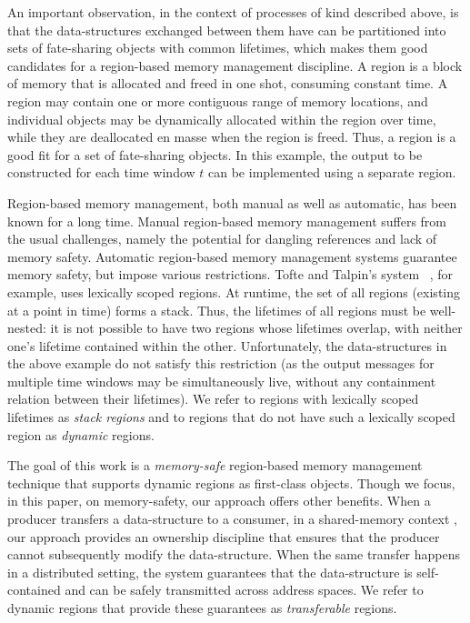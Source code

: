 
An important observation, in the context of processes of kind
described above, is that the data-structures exchanged between them
have can be partitioned into sets of fate-sharing objects with common
lifetimes, which makes them good candidates for a region-based memory
management discipline. A region is a block of memory that is allocated
and freed in one shot, consuming constant time. A region may contain
one or more contiguous range of memory locations, and individual
objects may be dynamically allocated within the region over time,
while they are deallocated en masse when the region is freed.  Thus, a
region is a good fit for a set of fate-sharing objects.
In this example, the output to be constructed for each time window $t$
can be implemented using a separate region.

Region-based memory management, both manual as well as automatic, has
been known for a long time. Manual region-based memory management
suffers from the usual challenges, namely the potential for dangling
references and lack of memory safety. Automatic region-based memory
management systems guarantee memory safety, but impose various
restrictions.  Tofte and Talpin's system~\cite{tofte94,tofte97} , for
example, uses lexically scoped regions.  At runtime, the set of all
regions (existing at a point in time) forms a stack. Thus, the
lifetimes of all regions must be well-nested: it is not possible to
have two regions whose lifetimes overlap, with neither one's lifetime
contained within the other.  Unfortunately, the data-structures in the
above example do not satisfy this restriction (as the output messages
for multiple time windows may be simultaneously live, without any
containment relation between their lifetimes).  We refer to regions
with lexically scoped lifetimes as \emph{stack regions} and to regions
that do not have such a lexically scoped region as \emph{dynamic}
regions.

The goal of this work is a \emph{memory-safe} region-based memory
management technique that supports dynamic regions as first-class
objects. Though we focus, in this paper, on memory-safety, our
approach offers other benefits.  When a producer transfers a
data-structure to a consumer, in a shared-memory context , our
approach provides an ownership discipline that ensures that the
producer cannot subsequently modify the data-structure. When the same
transfer happens in a distributed setting, the system guarantees that
the data-structure is self-contained and can be safely transmitted
across address spaces.  We refer to dynamic regions that provide these
guarantees as \emph{transferable} regions.

